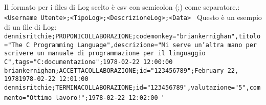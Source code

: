 Il formato per i files di Log scelto è csv con semicolon (;) come separatore.:
\newline
\texttt{
	<Username Utente>;<TipoLog>;<DescrizioneLog>;<Data>
}
\newline
Questo è un esempio di un file di Log:
\newline
\texttt{
	dennisritchie;PROPONICOLLABORAZIONE;codemonkey="briankernighan",titolo="The C Programming Language",descrizione="Mi serve un'altra mano per scrivere un manuale di programmazione per il linguaggio C",tags="C:documentazione";1978-02-22 12:00:00 \newline
	briankernighan;ACCETTACOLLABORAZIONE;id="123456789";February 22, 19781978-02-22 12:01:00 \newline
	dennisritchie;TERMINACOLLABORAZIONE;id="123456789",valutazione="5",commento="Ottimo lavoro!";1978-02-22 12:02:00 \newline
}'
\pagebreak